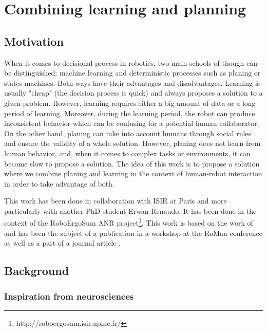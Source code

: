 \documentclass[english,a4paper,11pt,twoside]{StyleThese}
\begin{document}
\setcounter{chapter}{6} %
\dominitoc
\faketableofcontents
\fi

\chapter{Combining learning and planning}
\minitoc

\section{Motivation}

When it comes to decisional process in robotics, two main schools of though can be distinguished: machine learning and deterministic processes such as planing or states machines. Both ways have their advantages and disadvantages. Learning is usually "cheap" (the decision process is quick) and always proposes a solution to a given problem. However, learning requires either a big amount of data or a long period of learning. Moreover, during the learning period, the robot can produce inconsistent behavior which can be confusing for a potential human collaborator. On the other hand, planing can take into account humans through social rules and ensure the validity of a whole solution. However, planing does not learn from human behavior, and, when it comes to complex tasks or environments, it can become slow to propose a solution. The idea of this work is to propose a solution where we combine planing and learning in the context of human-robot interaction in order to take advantage of both. 

This work has been done in collaboration with ISIR at Paris and more particularly with another PhD student Erwan Renaudo. It has been done in the context of the RoboErgoSum ANR project\footnote{http://roboergosum.isir.upmc.fr/}. This work is based on the work of \cite{renaudo2014design} and has been the subject of a publication in a workshop at the RoMan conference \cite{renaudo2015learning} as well as a part of a journal article \cite{khamassi2016integration}.

\section{Background}

\subsection{Inspiration from neurosciences}
\end{document}
